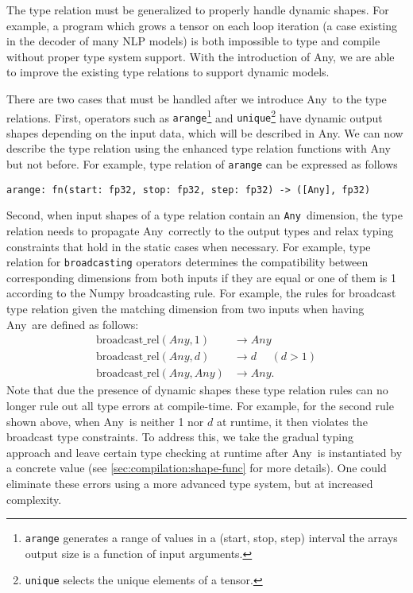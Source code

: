 The type relation must be generalized to properly handle dynamic shapes. For example, a program which grows a tensor on
each loop iteration (a case existing in the decoder of many NLP models) is both impossible to type and compile without proper type system support.
With the introduction of Any, we are able to improve the existing type relations to support dynamic models.

There are two cases that must be handled after we introduce Any~to the type relations.
First, operators such as {\tt arange}\footnote{{\tt arange} generates a range of values in a (start, stop, step) interval the arrays output size is a function of input arguments.} and {\tt unique}\footnote{{\tt unique} selects the unique elements of a tensor.} have dynamic output shapes depending on the input data, which will be described in Any.
We can now describe the type relation using the enhanced type relation functions with Any but not before.
For example, type relation of {\tt arange} can be expressed as follows
\begin{verbatim}
arange: fn(start: fp32, stop: fp32, step: fp32) -> ([Any], fp32)
\end{verbatim}

Second, when input shapes of a type relation contain an \verb|Any|~dimension,
  the type relation needs to propagate Any~correctly
  to the output types and relax typing constraints
  that hold in the static cases when necessary.
For example, type relation for {\tt broadcasting} operators
  determines the compatibility between corresponding
  dimensions from both inputs if they are equal or
  one of them is 1 according to the Numpy broadcasting rule.
For example, the rules for broadcast type relation given
  the matching dimension from two inputs when having
    Any~are defined as follows:
\begin{align*}
  \textrm{broadcast\_rel}(Any, 1) &\rightarrow Any \\
  \textrm{broadcast\_rel}(Any, d) &\rightarrow d ~~~~~~(d > 1) \\
  \textrm{broadcast\_rel}(Any, Any) &\rightarrow Any.
\end{align*}
Note that due the presence of dynamic shapes these type
  relation rules can no longer rule out all type errors at compile-time.
For example, for the second rule shown above, when
  Any~is neither 1 nor $d$ at runtime, it then violates
  the broadcast type constraints.
To address this, we take the gradual typing~\citep{gradualtyping}
  approach and leave certain type checking at runtime after
  Any~is instantiated by a concrete value (see \autoref{sec:compilation:shape-func}
  for more details).
One could eliminate these errors using a more advanced type system, but at increased complexity.

